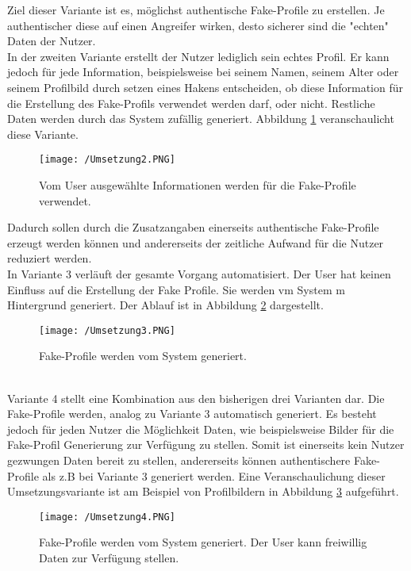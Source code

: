 \documentclass{sigchi}
\begin{document}
Ziel dieser Variante ist es, möglichst authentische Fake-Profile zu erstellen. Je authentischer diese auf einen Angreifer wirken, desto sicherer sind die "echten" Daten der Nutzer. \\
In der zweiten Variante erstellt der Nutzer lediglich sein echtes Profil. Er kann jedoch für jede Information, beispielsweise bei seinem Namen, seinem Alter oder seinem Profilbild durch setzen eines Hakens entscheiden, ob diese Information für die Erstellung des Fake-Profils verwendet werden darf, oder nicht. Restliche Daten werden durch das System zufällig generiert. Abbildung \ref{fig:Umsetzung2} veranschaulicht diese Variante. 
\begin{figure}[htbp]
	\texttt{[image: /Umsetzung2.PNG]}
	\caption{Vom User ausgewählte Informationen werden für die Fake-Profile verwendet.}
	\label{fig:Umsetzung2}
\end{figure}
Dadurch sollen durch die Zusatzangaben einerseits authentische Fake-Profile erzeugt werden können und andererseits der zeitliche Aufwand für die Nutzer reduziert werden. \\
In Variante 3 verläuft der gesamte Vorgang automatisiert. Der User hat keinen Einfluss auf die Erstellung der Fake Profile. Sie werden vm System m Hintergrund generiert. Der Ablauf ist in Abbildung \ref{fig:Umsetzung3} dargestellt.
\begin{figure}[htbp]
	\texttt{[image: /Umsetzung3.PNG]}
	\caption{Fake-Profile werden vom System generiert.}
	\label{fig:Umsetzung3}
\end{figure}
\\
Variante 4 stellt eine Kombination aus den bisherigen drei Varianten dar. Die Fake-Profile werden, analog zu Variante 3 automatisch generiert. Es besteht jedoch für jeden Nutzer die Möglichkeit Daten, wie beispielsweise Bilder für die Fake-Profil Generierung zur Verfügung zu stellen. Somit ist einerseits kein Nutzer gezwungen Daten bereit zu stellen, andererseits können authentischere Fake-Profile als z.B bei Variante 3 generiert werden. Eine Veranschaulichung dieser Umsetzungsvariante ist am Beispiel von Profilbildern in Abbildung \ref{fig:Umsetzung4} aufgeführt. 
\begin{figure}[htbp]
	\texttt{[image: /Umsetzung4.PNG]}
	\caption{Fake-Profile werden vom System generiert. Der User kann freiwillig Daten zur Verfügung stellen.}
	\label{fig:Umsetzung4}
\end{figure}
\end{document}
